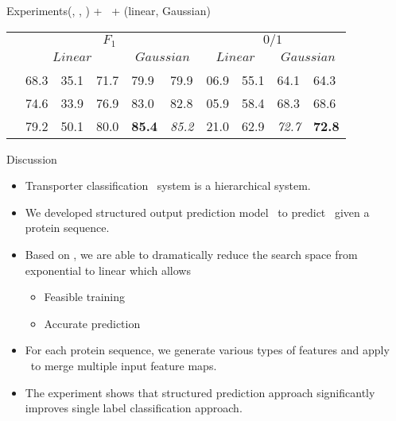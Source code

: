 \documentclass[first=dgreen,second=purple,logo=yellowexc]{aaltoslides}
\begin{document}
\begin{frame}{Experiments}{(\svm, \mmr, \sop) + \mkl\ +  (linear, Gaussian)}
	{\scriptsize
	\begin{tabular}{|p{1cm}|p{0.5cm}|p{0.5cm}p{0.5cm}|p{0.5cm}p{0.5cm}|p{0.5cm}p{0.5cm}|p{0.5cm}p{0.5cm}|} \hline
		& \multicolumn{5}{c|}{$F_1$} & \multicolumn{4}{c|}{$0/1$} \\ \cline{2-10}
		& \multicolumn{3}{c|}{$Linear$} & \multicolumn{2}{c|}{$Gaussian$} & \multicolumn{2}{c|}{$Linear$} & \multicolumn{2}{c|}{$Gaussian$} \\ \cline{2-10}
		& \svm & \mmr & \sop & \mmr & \sop & \mmr & \sop & \mmr & \sop \\ \hline
	\kunif    & 68.3& 35.1 & 71.7 & 79.9&  79.9  & 06.9 & 55.1 & 64.1 &  64.3 \\ 
	\kalign  & 74.6 & 33.9 & 76.9 & 83.0&  82.8  & 05.9 & 58.4 & 68.3 &  68.6 \\
	\kalignf & 79.2 & 50.1 & 80.0 & {\bf 85.4} &  {\it 85.2}  & 21.0 & 62.9 & {\it 72.7}&  {\bf 72.8} \\ \hline
	\end{tabular}}
\end{frame}

\begin{frame}{Discussion}
	\begin{itemize}
		\item Transporter classification \tc\ system is a hierarchical system.
		\item We developed structured output prediction model \sop\ to predict \tc\ given a protein sequence.
		\item Based on \tc, we are able to dramatically reduce the search space from exponential to linear which allows
		\begin{itemize}\footnotesize
			\item Feasible training
			\item Accurate prediction
		\end{itemize}
		\item For each protein sequence, we generate various types of features and apply \mkl\ to merge multiple input feature maps.
		\item The experiment shows that structured prediction approach significantly improves single label classification approach. 
	\end{itemize}
\end{frame}


\iffalse
\begin{frame}[allowframebreaks]{Bibliography}
	
	
\end{frame}
\fi
\end{document}
